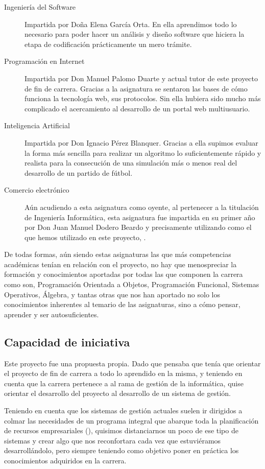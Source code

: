 \begin{description}
\item [Ingeniería del Software] Impartida por Doña Elena García Orta. En ella
  aprendimos todo lo necesario para poder hacer un análisis y diseño software
  que hiciera la etapa de codificación prácticamente un mero trámite.
\item [Programación en Internet] Impartida por Don Manuel Palomo Duarte y actual
  tutor de este proyecto de fin de carrera. Gracias a la asignatura se sentaron
  las bases de cómo funciona la tecnología web, sus protocolos. Sin ella hubiera
  sido mucho más complicado el acercamiento al desarrollo de un portal web
  multiusuario.
\item [Inteligencia Artificial] Impartida por Don Ignacio Pérez
  Blanquer. Gracias a ella supimos evaluar la forma más sencilla para realizar
  un algoritmo lo suficientemente rápido y realista para la consecución de una
  simulación más o menos real del desarrollo de un partido de fútbol.
\item [Comercio electrónico] Aún acudiendo a esta asignatura como oyente, al
  pertenecer a la titulación de Ingeniería Informática, esta asignatura fue
  impartida en su primer año por Don Juan Manuel Dodero Beardo y precisamente
  utilizando como  el que hemos utilizado en este proyecto,
  .
\end{description}

De todas formas, aún siendo estas asignaturas las que más competencias
académicas tenían en relación con el proyecto, no hay que menospreciar la
formación y conocimientos aportadas por todas las que componen la carrera como
son, Programación Orientada a Objetos, Programación Funcional, Sistemas
Operativos, Álgebra, y tantas otras que nos han aportado no solo los
conocimientos inherentes al temario de las asignaturas, sino a cómo pensar,
aprender y ser autosuficientes.

\subsection{Capacidad de iniciativa}
Este proyecto fue una propuesta propia. Dado que pensaba que tenía que orientar
el proyecto de fin de carrera a todo lo aprendido en la misma, y teniendo en
cuenta que la carrera pertenece a al rama de gestión de la informática, quise
orientar el desarrollo del proyecto al desarrollo de un sistema de gestión.

Teniendo en cuenta que los sistemas de gestión actuales suelen ir dirigidos a
colmar las necesidades de un programa integral que abarque toda la planificación
de recursos empresariales (), quisimos distanciarnos un poco de ese
tipo de sistemas y crear algo que nos reconfortara cada vez que estuviéramos
desarrollándolo, pero siempre teniendo como objetivo poner en práctica los
conocimientos adquiridos en la carrera.

